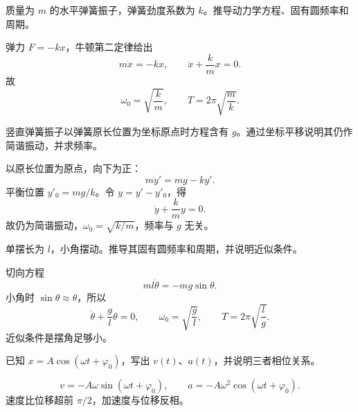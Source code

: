 %
%

\begin{exercise}[level=basic]
质量为 $m$ 的水平弹簧振子，弹簧劲度系数为 $k$。推导动力学方程、固有圆频率和周期。
\begin{solution}
弹力 $F=-kx$，牛顿第二定律给出
\[
  m\ddot x=-kx,\qquad \ddot x+\frac{k}{m}x=0.
\]
故
\[
  \omega_0=\sqrt{\frac{k}{m}},\qquad T=2\pi\sqrt{\frac{m}{k}}.
\]
\end{solution}
\end{exercise}

\begin{exercise}[level=basic]
竖直弹簧振子以弹簧原长位置为坐标原点时方程含有 $g$。通过坐标平移说明其仍作简谐振动，并求频率。
\begin{solution}
以原长位置为原点，向下为正：
\[
  m\ddot y'=mg-ky'.
\]
平衡位置 $y'_0=mg/k$。令 $y=y'-y'_0$，得
\[
  \ddot y+\frac{k}{m}y=0.
\]
故仍为简谐振动，$\omega_0=\sqrt{k/m}$，频率与 $g$ 无关。
\end{solution}
\end{exercise}

\begin{exercise}[level=basic]
单摆长为 $l$，小角摆动。推导其固有圆频率和周期，并说明近似条件。
\begin{solution}
切向方程
\[
  ml\ddot\theta=-mg\sin\theta.
\]
小角时 $\sin\theta\approx\theta$，所以
\[
  \ddot\theta+\frac{g}{l}\theta=0,\qquad
  \omega_0=\sqrt{\frac{g}{l}},\qquad
  T=2\pi\sqrt{\frac{l}{g}}.
\]
近似条件是摆角足够小。
\end{solution}
\end{exercise}

\begin{exercise}[level=basic]
已知 $x=A\cos(\omega t+\varphi_0)$，写出 $v(t)$、$a(t)$，并说明三者相位关系。
\begin{solution}
\[
  v=-A\omega\sin(\omega t+\varphi_0),\qquad
  a=-A\omega^2\cos(\omega t+\varphi_0).
\]
速度比位移超前 $\pi/2$，加速度与位移反相。
\end{solution}
\end{exercise}

